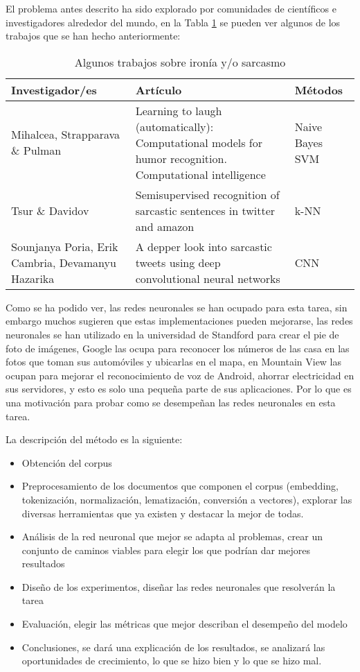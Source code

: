 		\par El problema antes descrito ha sido explorado por comunidades de científicos e investigadores alrededor del mundo, en la Tabla \ref{table:AlgunosTrabajos} se pueden ver algunos de los trabajos que se han hecho anteriormente:
		\begin{table}[h!]
		\centering
			\begin{tabular} {|p{3cm}|p{6cm}|p{2cm}| }
 			\hline
			Investigador/es & Artículo & Métodos \\[0.5ex]
			\hline
			Mihalcea, Strapparava \& Pulman & Learning to laugh (automatically): Computational models for humor recognition.  Computational intelligence & Naive Bayes SVM \\
			\hline
			Tsur \& Davidov & Semisupervised recognition of sarcastic sentences in twitter and amazon & k-NN \\
			\hline
			Sounjanya Poria, Erik Cambria, Devamanyu Hazarika & A depper look into sarcastic tweets using deep convolutional neural networks & CNN \\[1 ex]
			\hline
			\end{tabular}
			\caption{Algunos trabajos sobre ironía y/o sarcasmo}
			\label{table:AlgunosTrabajos}
		\end{table}
		
		\par Como se ha podido ver, las redes neuronales se han ocupado para esta tarea, sin embargo muchos sugieren que estas implementaciones pueden mejorarse, las redes neuronales se han utilizado en la universidad de Standford para crear el pie de foto de imágenes, Google las ocupa para reconocer los números de las casa en las fotos que toman sus automóviles y ubicarlas en el mapa, en Mountain View las ocupan para mejorar el reconocimiento de voz de  Android, ahorrar electricidad en sus servidores, y esto es solo una pequeña parte de sus aplicaciones. Por lo que es una motivación para probar como se desempeñan las redes neuronales en esta tarea. 
		
		\par La descripción del método es la siguiente:
		\begin{itemize}
			\item Obtención del corpus
			\item Preprocesamiento de los documentos que componen el corpus (embedding, tokenización, normalización, lematización, conversión a vectores), explorar las diversas herramientas que ya existen y destacar la mejor de todas.
			\item Análisis de la red neuronal que mejor se adapta al problemas, crear un conjunto de caminos viables para elegir los que podrían dar mejores resultados
			\item Diseño de los experimentos, diseñar las redes neuronales que resolverán la tarea
			\item Evaluación, elegir las métricas que mejor describan el desempeño del modelo
			\item Conclusiones, se dará una explicación de los resultados, se analizará las oportunidades de crecimiento, lo que se hizo bien y lo que se hizo mal.
		\end{itemize}
 		
